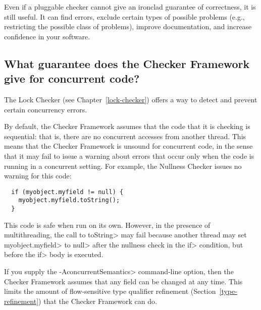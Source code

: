 Even if a pluggable checker cannot give an ironclad
guarantee of correctness, it is still useful.  It can find errors,
exclude certain types of possible problems (e.g., restricting the
possible class of problems), improve documentation, and increase confidence
in your software.


\subsection{What guarantee does the Checker Framework give for concurrent code?\label{faq-concurrency}}

The Lock Checker (see Chapter~\ref{lock-checker}) offers a way to detect
and prevent certain concurrency errors.


By default, the Checker Framework assumes that the code that it is checking
is sequential:  that is, there are no concurrent accesses from another
thread.  This means that the Checker Framework is unsound for concurrent
code, in the sense that it may fail to issue a warning about errors that
occur only when the code is running in a concurrent setting.
For example, the Nullness Checker issues no warning for this
code:

\begin{Verbatim}
  if (myobject.myfield != null) {
    myobject.myfield.toString();
  }
\end{Verbatim}

\noindent
This code is safe when run on its own.
However, in the presence of multithreading, the call to \<toString> may
fail because another thread may set \<myobject.myfield> to \<null> after
the nullness check in the \<if> condition, but before the \<if> body is
executed.

If you supply the \<-AconcurrentSemantics> command-line option, then the
Checker Framework assumes that any field can be changed at any time.  This
limits the amount of flow-sensitive type qualifier refinement
(Section~\ref{type-refinement}) that the Checker Framework can do.


